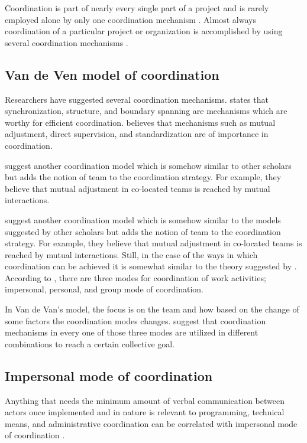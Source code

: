 Coordination is part of nearly every single part of a project and is rarely employed alone by only one coordination mechanism \citep{Osifo2012}. Almost always coordination of a particular project or organization is accomplished by using several coordination mechanisms \citep{Dietrich2013}.

\subsection{Van de Ven model of coordination}
Researchers have suggested several coordination mechanisms. \citet{Strode2012} states that synchronization, structure, and boundary spanning are mechanisms which are worthy for efficient coordination. \citet{Mintzberg1980} believes that mechanisms such as mutual adjustment, direct supervision, and standardization are of importance in coordination.

\citet{VanDeVen1976} suggest another coordination model which is somehow similar to other scholars but adds the notion of team to the coordination strategy. For example, they believe that mutual adjustment in co-located teams is reached by mutual interactions.

\citet{VanDeVen1976} suggest another coordination model which is somehow similar to the models suggested by other scholars but adds the notion of team to the coordination strategy. For example, they believe that mutual adjustment in co-located teams is reached by mutual interactions.
Still, in the case of the ways in which coordination can be achieved it is somewhat similar to the theory suggested by  \citet{Thompson2014}. According to \citet{VanDeVen1976}, there are three modes for coordination of work activities; impersonal, personal, and group mode of coordination.

In Van de Van's model, the focus is on the team and how based on the change of some factors the coordination modes changes. \citet{VanDeVen1976} suggest that coordination mechanisms in every one of those three modes are utilized in different combinations to reach a certain collective goal.

\subsection{Impersonal mode of coordination}
Anything that needs the minimum amount of verbal communication between actors once implemented and in nature is relevant to programming, technical means, and administrative coordination can be correlated with impersonal mode of coordination \citep{Boos2011,VanDeVen1976}.

